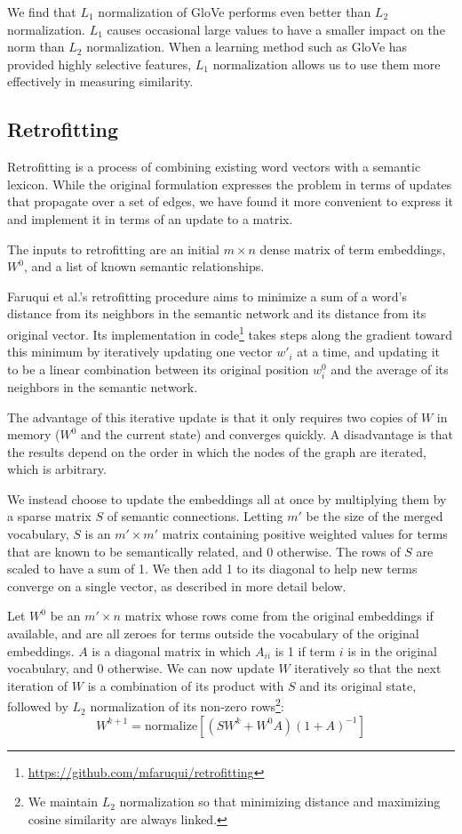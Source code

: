 \documentclass[11pt,letterpaper]{article}
\begin{document}
We find that $L_1$ normalization of GloVe performs even better than $L_2$
normalization. $L_1$ causes occasional large values to have a smaller impact on the norm
than $L_2$ normalization. When a learning method such as GloVe has provided
highly selective features, $L_1$ normalization allows us to use them more effectively
in measuring similarity.


\subsection{Retrofitting}

Retrofitting \cite{faruqui2015retrofitting} is a process of combining existing
word vectors with a semantic lexicon. While the original formulation expresses
the problem in terms of updates that propagate over a set of edges, we have
found it more convenient to express it and implement it in terms of an update
to a matrix.

The inputs to retrofitting are an initial $m \times n$ dense matrix of term
embeddings, $W^0$, and a list of known semantic relationships.

Faruqui et al.'s retrofitting procedure aims to minimize a sum of
a word's distance from its neighbors in the semantic network and its distance
from its original vector. Its implementation in code\footnote{
    \url{https://github.com/mfaruqui/retrofitting}
} takes steps along the gradient toward this minimum
by iteratively updating one vector $w'_i$ at a time, and updating it to be a linear
combination between its original position $w^0_i$ and the average of its neighbors
in the semantic network.

The advantage of this iterative update is that it only requires two copies of
$W$ in memory ($W^0$ and the current state) and converges quickly. A disadvantage
is that the results depend on the order in which the nodes of the graph are
iterated, which is arbitrary.

We instead choose to update the embeddings all at once by multiplying them by a
sparse matrix $S$ of semantic connections. Letting $m'$ be the size of the
merged vocabulary, $S$ is an $m' \times m'$ matrix containing positive weighted
values for terms that are known to be semantically related, and 0 otherwise.
The rows of $S$ are scaled to have a sum of 1. We then add 1 to its diagonal to
help new terms converge on a single vector, as described in more detail below.

Let $W^0$ be an $m' \times n$ matrix whose rows come from the original
embeddings if available, and are all zeroes for terms outside the vocabulary of
the original embeddings. $A$ is a diagonal matrix in which $A_{ii}$ is 1 if term
$i$ is in the original vocabulary, and 0 otherwise. We can now update $W$
iteratively so that the next iteration of $W$ is a combination of its product
with $S$ and its original state, followed by $L_2$ normalization of its
non-zero rows\footnote{
    We maintain $L_2$ normalization so that minimizing distance and maximizing
    cosine similarity are always linked.
}:
$$
W^{k+1} = \mathrm{normalize}\left[ \left( S W^k + W^0 A \right)\left( 1 + A \right)^{-1} \right]
$$
\end{document}
